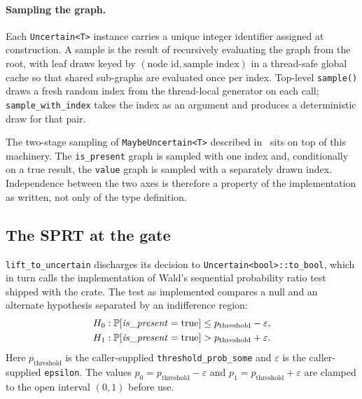 \paragraph{Sampling the graph.} Each \texttt{Uncertain<T>} instance carries
a unique integer identifier assigned at construction. A sample is the result
of recursively evaluating the graph from the root, with leaf draws keyed by
$(\text{node id}, \text{sample index})$ in a thread-safe global cache so that
shared sub-graphs are evaluated once per index. Top-level \texttt{sample()}
draws a fresh random index from the thread-local generator on each call;
\texttt{sample\_with\_index} takes the index as an argument and produces a
deterministic draw for that pair.

The two-stage sampling of \texttt{MaybeUncertain<T>} described
in~ sits on top of this machinery. The
\texttt{is\_present} graph is sampled with one index and, conditionally on a
true result, the \texttt{value} graph is sampled with a separately drawn
index. Independence between the two axes is therefore a property of the
implementation as written, not only of the type definition.

\subsection{The SPRT at the gate}
\label{sec:semantics:sprt}

\texttt{lift\_to\_uncertain} discharges its decision to
\texttt{Uncertain<bool>::to\_bool}, which in turn calls the implementation of
Wald's sequential probability ratio test~\cite{wald1945sprt,wald1948optimum}
shipped with the crate. The test as implemented compares a null and an
alternate hypothesis separated by an indifference region:
\begin{align*}
H_0 &: \mathbb{P}[\mathit{is\_present} = \text{true}] \le p_{\text{threshold}} - \varepsilon, \\
H_1 &: \mathbb{P}[\mathit{is\_present} = \text{true}] > p_{\text{threshold}} + \varepsilon.
\end{align*}
Here $p_{\text{threshold}}$ is the caller-supplied
\texttt{threshold\_prob\_some} and $\varepsilon$ is the caller-supplied
\texttt{epsilon}. The values $p_0 = p_{\text{threshold}} - \varepsilon$ and
$p_1 = p_{\text{threshold}} + \varepsilon$ are clamped to the open interval
$(0, 1)$ before use.

